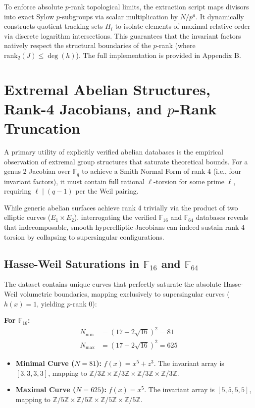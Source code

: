 \documentclass[letterpaper, 11pt]{article}
\begin{document}
To enforce absolute $p$-rank topological limits, the extraction script maps divisors into exact Sylow $p$-subgroups via scalar multiplication by $N/p^a$. It dynamically constructs quotient tracking sets $H_i$ to isolate elements of maximal relative order via discrete logarithm intersections. This guarantees that the invariant factors natively respect the structural boundaries of the $p$-rank (where $\text{rank}_2(J) \le \deg(h)$). The full implementation is provided in Appendix B.

\section{Extremal Abelian Structures, Rank-4 Jacobians, and \texorpdfstring{$p$}{p}-Rank Truncation}
A primary utility of explicitly verified abelian databases is the empirical observation of extremal group structures that saturate theoretical bounds. For a genus 2 Jacobian over $\mathbb{F}_q$ to achieve a Smith Normal Form of rank 4 (i.e., four invariant factors), it must contain full rational $\ell$-torsion for some prime $\ell$, requiring $\ell \mid (q-1)$ per the Weil pairing. 

While generic abelian surfaces achieve rank 4 trivially via the product of two elliptic curves ($E_1 \times E_2$), interrogating the verified $\mathbb{F}_{16}$ and $\mathbb{F}_{64}$ databases reveals that indecomposable, smooth hyperelliptic Jacobians can indeed sustain rank 4 torsion by collapsing to supersingular configurations. 

\subsection{Hasse-Weil Saturations in \texorpdfstring{$\mathbb{F}_{16}$}{F\_16} and \texorpdfstring{$\mathbb{F}_{64}$}{F\_64}}
The dataset contains unique curves that perfectly saturate the absolute Hasse-Weil volumetric boundaries, mapping exclusively to supersingular curves ($h(x) = 1$, yielding $p$-rank 0):

\textbf{For $\mathbb{F}_{16}$:}
\begin{align*}
    N_{\text{min}} &= (17 - 2\sqrt{16})^2 = 81 \\
    N_{\text{max}} &= (17 + 2\sqrt{16})^2 = 625
\end{align*}
\begin{itemize}
    \item \textbf{Minimal Curve ($N=81$):} $f(x) = x^5 + z^3$. The invariant array is $[3, 3, 3, 3]$, mapping to $\mathbb{Z}/3\mathbb{Z} \times \mathbb{Z}/3\mathbb{Z} \times \mathbb{Z}/3\mathbb{Z} \times \mathbb{Z}/3\mathbb{Z}$.
    \item \textbf{Maximal Curve ($N=625$):} $f(x) = x^5$. The invariant array is $[5, 5, 5, 5]$, mapping to $\mathbb{Z}/5\mathbb{Z} \times \mathbb{Z}/5\mathbb{Z} \times \mathbb{Z}/5\mathbb{Z} \times \mathbb{Z}/5\mathbb{Z}$.
\end{itemize}
\end{document}

